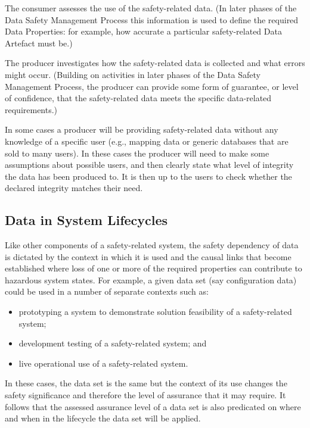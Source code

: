 The consumer assesses the use of the safety-related data. (In later phases of the Data Safety Management Process this \gls{information} is used to define the required Data Properties: for example, how accurate a particular safety-related Data Artefact must be.)

The producer investigates how the safety-related data is collected and what errors might occur. (Building on activities in later phases of the Data Safety Management Process, the producer can provide some form of guarantee, or level of confidence, that the safety-related data meets the specific data-related requirements.)

In some cases a producer will be providing safety-related data without any knowledge of a specific user (e.g., mapping data or generic \glspl{database} that are sold to many users). In these cases the producer will need to make some assumptions about possible users, and then clearly state what level of \gls{integrity} the data has been produced to. It is then up to the users to check whether the declared \gls{integrity} matches their need.

\subsection{Data in System Lifecycles}
Like other components of a safety-related system, the safety dependency of data is dictated by the context in which it is used and the causal links that become established where loss of one or more of the required properties can contribute to hazardous system states. For example, a given data set (say \gls{configuration data}) could be used in a number of separate contexts such as:
\begin{itemize}
  \item prototyping a system to demonstrate solution feasibility of a safety-related system;
  \item development testing of a safety-related system; and
  \item live operational use of a safety-related system.
\end{itemize}

In these cases, the data set is the same but the context of its use changes the safety significance and therefore the level of assurance that it may require. It follows that the assessed assurance level of a data set is also predicated on where and when in the lifecycle the data set will be applied. 


